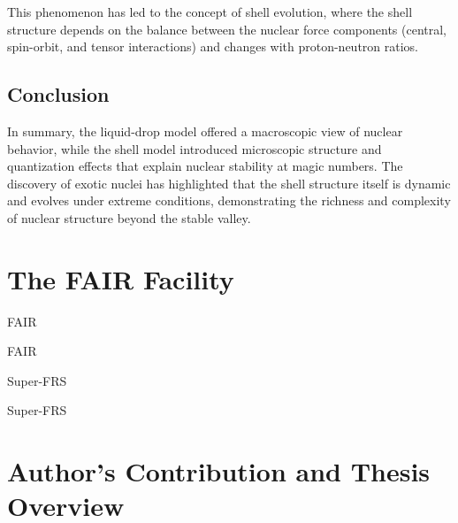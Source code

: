 This phenomenon has led to the concept of shell evolution, where the shell structure depends on the balance between the nuclear force components (central, spin-orbit, and tensor interactions) and changes with proton-neutron ratios.

\subsection{Conclusion}

In summary, the liquid-drop model offered a macroscopic view of nuclear behavior, while the shell model introduced microscopic structure and quantization effects that explain nuclear stability at magic numbers. The discovery of exotic nuclei has highlighted that the shell structure itself is dynamic and evolves under extreme conditions, demonstrating the richness and complexity of nuclear structure beyond the stable valley.

%
%

%
%
%
%
%
%
%
\section{The FAIR Facility}

\gls{FAIR}

\gls{FAIR}

\gls{Super-FRS}

\gls{Super-FRS}

\section{Author's Contribution and Thesis Overview}
